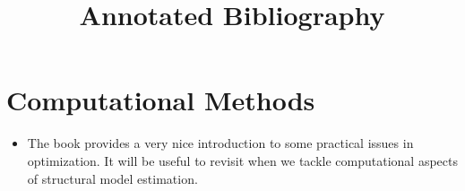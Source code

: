 

\title{Annotated Bibliography}
\author{}
\date{}



\maketitle
\tableofcontents

\section{Computational Methods}
\begin{itemize}
\item {}

The book provides a very nice introduction to some practical issues in optimization. It will be useful to revisit when we tackle computational aspects of structural model estimation.

\end{itemize}
